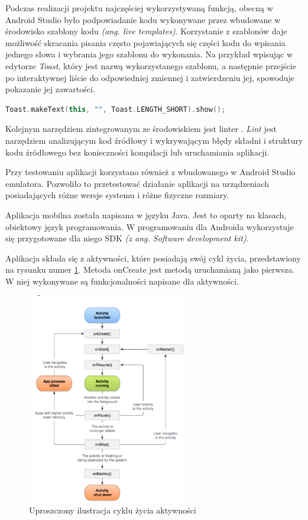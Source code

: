 \documentclass[a4paper,12pt, twoside]{article}
\begin{document}
        Podczas realizacji projektu najczęściej wykorzystywaną funkcją, obecną w Android Studio było podpowiadanie kodu wykonywane przez wbudowane w środowisko szablony kodu \textit{(ang. live templates)}. Korzystanie z szablonów daje możliwość skracania pisania często pojawiających się części kodu do wpisania jednego słowa i wybrania jego szablonu do wykonania. Na przykład wpisując w edytorze \textit{Toast}, który jest nazwą wykorzystanego szablonu, a następnie przejście po interaktywnej liście do odpowiedniej zmiennej i zatwierdzeniu jej, spowoduje pokazanie jej zawartości. 
    
    \begin{lstlisting}[language=C++, caption=Zawartość szablonu Toast]
Toast.makeText(this, "", Toast.LENGTH_SHORT).show();\end{lstlisting}
    
        Kolejnym narzędziem zintegrowanym ze środowiskiem jest linter \cite{lint}. \textit{Lint} jest narzędziem analizującym kod źródłowy i wykrywającym błędy składni i struktury kodu źródłowego bez konieczności kompilacji lub uruchamiania aplikacji.
    
        Przy testowaniu aplikacji korzystano również z wbudowanego w Android Studio emulatora. Pozwoliło to przetestować działanie aplikacji na urządzeniach posiadających różne wersje systemu i różne fizyczne rozmiary. 

    	Aplikacja mobilna została napisana w języku Java. Jest to oparty na klasach, obiektowy język programowania. W programowaniu dla Androida wykorzystuje się przygotowane dla niego SDK\textit{ (z ang. Software development kit)}\cite{sdk}.
    	
    	Aplikacja składa się z aktywności, które posiadają swój cykl życia, przedstawiony na rysunku numer \ref{fig:lifecycle}. Metoda onCreate jest metodą uruchamianą jako pierwsza. W niej wykonywane są funkcjonalności napisane dla aktywności.
    
    	\begin{figure}[H]
    	        \centering
    			\includegraphics[width=7cm]{images/rys6_androidlifecycle.png}
    			\caption{Uproszczony ilustracja cyklu życia aktywności \cite{lifecycle}}
                \label{fig:lifecycle}
    	\end{figure}
    	
\end{document}
